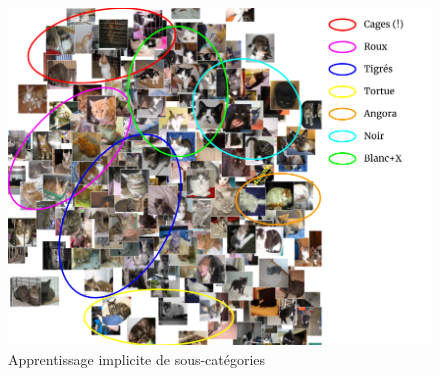 \documentclass[xcolor=table, hyperref={pdfpagelabels=false}]{beamer}
\begin{document}
\begin{frame}
\begin{figure}[H]
	\centering
	\includegraphics[width=.90\textwidth]{./images/tsne_vgg_zoom_clusters.png}
	\caption{Apprentissage implicite de sous-catégories}
\end{figure}
\end{frame}
\end{document}
